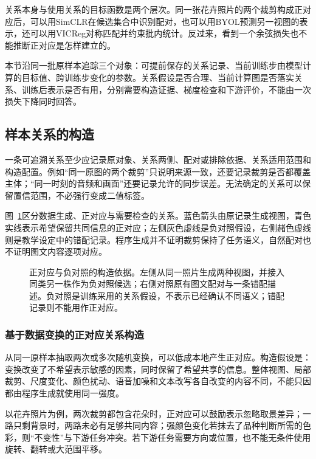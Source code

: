 关系本身与使用关系的目标函数是两个层次。同一张花卉照片的两个裁剪构成正对应后，可以用SimCLR在候选集合中识别配对，也可以用BYOL预测另一视图的表示，还可以用VICReg对称匹配并约束批内统计。反过来，看到一个余弦损失也不能推断正对应是怎样建立的。

本节沿同一批原样本追踪三个对象：可提前保存的关系记录、当前训练步由模型计算的目标值、跨训练步变化的参数。关系假设是否合理、当前计算图是否落实关系、训练后表示是否有用，分别需要构造证据、梯度检查和下游评价，不能由一次损失下降同时回答。

\subsection{样本关系的构造}
\label{sec:data-derived-knowledge-relation-construction}

一条可追溯关系至少应记录原对象、关系两侧、配对或排除依据、关系适用范围和构造配置。例如“同一原图的两个裁剪”只说明来源一致，还要记录裁剪是否都覆盖主体；“同一时刻的音频和画面”还要记录允许的同步误差。无法确定的关系可以保留置信范围，不必强行变成二值标签。

图~\ref{fig:data-derived-knowledge-relation-construction}区分数据生成、正对应与需要检查的关系。蓝色箭头由原记录生成视图，青色实线表示希望保留共同信息的正对应；左侧灰色虚线是负对照假设，右侧赭色虚线则是教学设定中的错配记录。程序生成并不证明裁剪保持了任务语义，自然配对也不证明图文内容逐项对应。

\begin{figure}[htbp]
  \centering
  
  \caption{正对应与负对照的构造依据。左侧从同一照片生成两种视图，并接入同类另一株作为负对照候选；右侧对照原有图文配对与一条错配描述。负对照是训练采用的关系假设，不表示已经确认不同语义；错配记录则不能用作正对应。}
  \label{fig:data-derived-knowledge-relation-construction}
\end{figure}
\FloatBarrier

\subsubsection{基于数据变换的正对应关系构造}
\label{sec:data-derived-knowledge-transformation-positive}

从同一原样本抽取两次或多次随机变换，可以低成本地产生正对应。构造假设是：变换改变了不希望表示敏感的因素，同时保留了希望共享的信息。整体视图、局部裁剪、尺度变化、颜色扰动、语音加噪和文本改写各自改变的内容不同，不能只因都由程序生成就使用同一强度。

以花卉照片为例，两次裁剪都包含花朵时，正对应可以鼓励表示忽略取景差异；一路只剩背景时，两路未必有足够共同内容；强颜色变化若抹去了品种判断所需的色彩，则“不变性”与下游任务冲突。若下游任务需要方向或位置，也不能无条件使用旋转、翻转或大范围平移。

